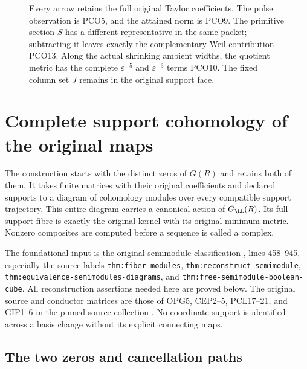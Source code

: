 \documentclass[11pt,a4paper]{article}
\theoremstyle{definition}\newtheorem{definition}[theorem]{Definition}
\newcommand{\C}{\mathbb C}\newcommand{\R}{\mathbb R}
\begin{document}
\begin{figure}[ht]
\centering
{}
\caption{Every arrow retains the full original Taylor coefficients.
The pulse observation is PCO5, and the attained norm is PCO9.
The primitive section $S$ has a different representative in the
same packet; subtracting it leaves exactly the complementary
Weil contribution PCO13. Along the actual shrinking ambient
widths, the quotient metric has the complete
$\varepsilon^{-5}$ and $\varepsilon^{-3}$ terms PCO10.
The fixed column set $J$ remains in the original support face.}
\end{figure}

\section{Complete support cohomology of the original maps}


The construction starts with the distinct zeros of \(G(R)\) and retains
both of them. It takes finite matrices with their original coefficients
and declared supports to a diagram of cohomology modules over every
compatible support trajectory. This entire diagram carries a canonical
action of \(G_{\LL}(R)\). Its full-support fibre is exactly the original
kernel with its original minimum metric. Nonzero composites are computed
before a sequence is called a complex.

The foundational input is the original semimodule classification
\cite{secondary}, lines 458--945, especially the source labels
\texttt{thm:fiber-modules}, \texttt{thm:reconstruct-semimodule},
\texttt{thm:equivalence-semimodules-diagrams}, and
\texttt{thm:free-semimodule-boolean-cube}.
All reconstruction assertions needed here are proved below.
The original source and conductor matrices are those of OPG5, CEP2--5,
PCL17--21, and GIP1--6 in the pinned source collection \cite{programme}.
No coordinate support is identified across a basis change without its
explicit connecting maps.

\subsection{The two zeros and cancellation paths}
\end{document}
